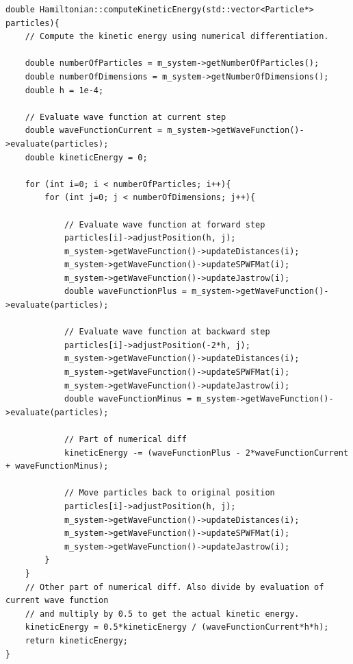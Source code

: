 \documentclass[../main.tex]{subfiles}
\begin{document}
\begin{lstlisting}[caption={Function for calculating the kinetic energy by numerical differentiation. The function is general for all the sub classes of the Hamiltonian class, and is therefore implemented once, in the super class "hamiltonian.cpp".}]
double Hamiltonian::computeKineticEnergy(std::vector<Particle*> particles){
    // Compute the kinetic energy using numerical differentiation.

    double numberOfParticles = m_system->getNumberOfParticles();
    double numberOfDimensions = m_system->getNumberOfDimensions();
    double h = 1e-4;

    // Evaluate wave function at current step
    double waveFunctionCurrent = m_system->getWaveFunction()->evaluate(particles);
    double kineticEnergy = 0;

    for (int i=0; i < numberOfParticles; i++){
        for (int j=0; j < numberOfDimensions; j++){

            // Evaluate wave function at forward step
            particles[i]->adjustPosition(h, j);
            m_system->getWaveFunction()->updateDistances(i);
            m_system->getWaveFunction()->updateSPWFMat(i);
            m_system->getWaveFunction()->updateJastrow(i);
            double waveFunctionPlus = m_system->getWaveFunction()->evaluate(particles);

            // Evaluate wave function at backward step
            particles[i]->adjustPosition(-2*h, j);
            m_system->getWaveFunction()->updateDistances(i);
            m_system->getWaveFunction()->updateSPWFMat(i);
            m_system->getWaveFunction()->updateJastrow(i);
            double waveFunctionMinus = m_system->getWaveFunction()->evaluate(particles);

            // Part of numerical diff
            kineticEnergy -= (waveFunctionPlus - 2*waveFunctionCurrent + waveFunctionMinus);

            // Move particles back to original position
            particles[i]->adjustPosition(h, j);
            m_system->getWaveFunction()->updateDistances(i);
            m_system->getWaveFunction()->updateSPWFMat(i);
            m_system->getWaveFunction()->updateJastrow(i);
        }
    }
    // Other part of numerical diff. Also divide by evaluation of current wave function
    // and multiply by 0.5 to get the actual kinetic energy.
    kineticEnergy = 0.5*kineticEnergy / (waveFunctionCurrent*h*h);
    return kineticEnergy;
}
\end{lstlisting}
\end{document}
